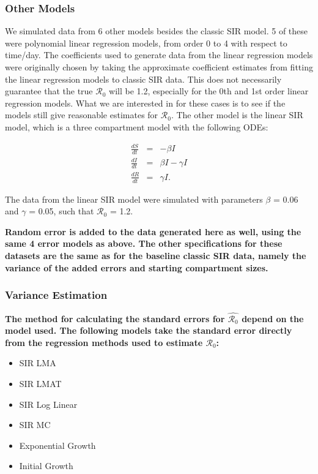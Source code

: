 \documentclass[12pt]{article}
\newcommand{\rr}{\ensuremath{\mathcal{R}_0}}
\begin{document}
\subsubsection{Other Models}
We simulated data from 6 other models besides the classic SIR model. 5 of these were polynomial linear regression models, from order 0 to 4 with respect to time/day. The coefficients used to generate data from the linear regression models were originally chosen by taking the approximate coefficient estimates from fitting the linear regression models to classic SIR data. This does not necessarily guarantee that the true $\rr$ will be 1.2, especially for the 0th and 1st order linear regression models. What we are interested in for these cases is to see if the models still give reasonable estimates for $\rr$. The other model is the linear SIR model, which is a three compartment model with the following ODEs:

	\begin{eqnarray*}
		\frac{dS}{dt} &=& -\beta I \\
		\frac{dI}{dt} &=& \beta I - \gamma I \\
		\frac{dR}{dt} &=& \gamma I.
	\end{eqnarray*}

 The data from the linear SIR model were simulated with parameters $\beta$ = 0.06 and $\gamma$ = 0.05, such that $\rr$ = 1.2. 
 
 \textbf{Random error is added to the data generated here as well, using the same 4 error models as above. The other specifications for these datasets are the same as for the baseline classic SIR data, namely the variance of the added errors and starting compartment sizes.}

\subsubsection{Variance Estimation}

\textbf{The method for calculating the standard errors for $\hat{\rr}$ depend on the model used. The following models take the standard error directly from the regression methods used to estimate $\rr$:}

	\begin{itemize}
		\item SIR LMA
		\item SIR LMAT
		\item SIR Log Linear
		\item SIR MC
		\item Exponential Growth
		\item Initial Growth
	\end{itemize}
\end{document}

